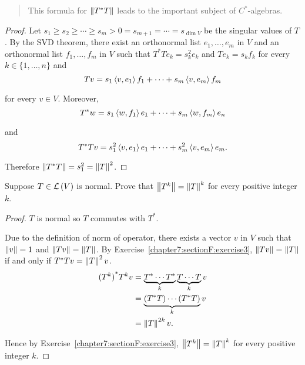 \begin{quote}
    This formula for $\left\Vert{T^{*}T}\right\Vert$ leads to the important subject of $C^{*}$-algebras.
\end{quote}

\begin{proof}
    Let $s_{1}\geq s_{2}\geq \cdots \geq s_{m} > 0 = s_{m+1} = \cdots = s_{\dim V}$ be the singular values of $T$. By the SVD theorem, there exist an orthonormal list $e_{1}, \ldots, e_{m}$ in $V$ and an orthonormal list $f_{1}, \ldots, f_{m}$ in $V$ such that $T^{*}Te_{k} = s_{k}^{2}e_{k}$ and $Te_{k} = s_{k}f_{k}$ for every $k\in\{ 1,\ldots,n \}$ and
    \[
        Tv = s_{1}\left\langle{v,e_{1}}\right\rangle f_{1} + \cdots + s_{m}\left\langle{v,e_{m}}\right\rangle f_{m}
    \]

    for every $v\in V$. Moreover,
    \[
        T^{*}w = s_{1}\left\langle{w,f_{1}}\right\rangle e_{1} + \cdots + s_{m}\left\langle{w,f_{m}}\right\rangle e_{n}
    \]

    and
    \[
        T^{*}Tv = s_{1}^{2}\left\langle{v,e_{1}}\right\rangle e_{1} + \cdots + s_{m}^{2}\left\langle{v,e_{m}}\right\rangle e_{m}.
    \]

    Therefore $\left\Vert{T^{*}T}\right\Vert = s_{1}^{2} = \left\Vert{T}\right\Vert^{2}$.
\end{proof}
\newpage

\begin{exercise}
    Suppose $T \in \mathcal{L}\left({V}\right)$ is normal. Prove that $\left\Vert{T^{k}}\right\Vert = \left\Vert{T}\right\Vert^{k}$ for every positive integer $k$.
\end{exercise}

\begin{proof}
    $T$ is normal so $T$ commutes with $T^{*}$.

    Due to the definition of norm of operator, there exists a vector $v$ in $V$ such that $\left\Vert{v}\right\Vert = 1$ and $\left\Vert{Tv}\right\Vert = \left\Vert{T}\right\Vert$. By Exercise~\ref{chapter7:sectionF:exercise3}, $\left\Vert{Tv}\right\Vert = \left\Vert{T}\right\Vert$ if and only if $T^{*}Tv = \left\Vert{T}\right\Vert^{2}v$.
    \begin{align*}
        {(T^{k})}^{*}T^{k}v & = \underbrace{T^{*}\cdots T^{*}}_{k}\underbrace{T\cdots T}_{k}v \\
                            & = \underbrace{(T^{*}T)\cdots (T^{*}T)}_{k}v                     \\
                            & = \left\Vert{T}\right\Vert^{2k}v.
    \end{align*}

    Hence by Exercise~\ref{chapter7:sectionF:exercise3}, $\left\Vert{T^{k}}\right\Vert = \left\Vert{T}\right\Vert^{k}$ for every positive integer $k$.
\end{proof}
\newpage

